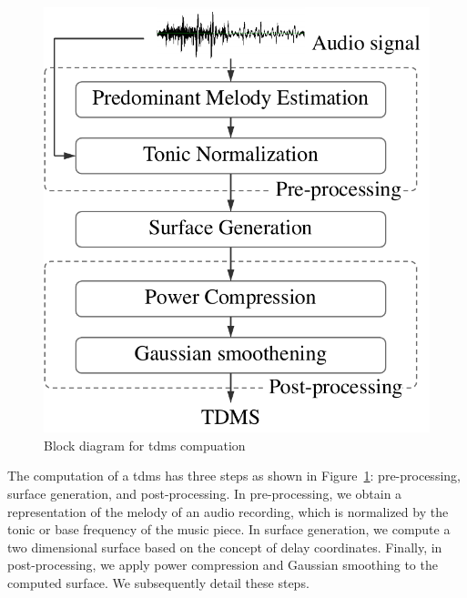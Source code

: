 \subsection{}
\label{sec:tdms_feature_extraction}

\begin{figure}
	\begin{center}
		\includegraphics[width=\figSizeSixty]{ch07_ragaRecognition/figures/tdms_computation.pdf}
	\end{center}
	\caption{Block diagram for \gls{tdms} compuation}
	\label{fig:bd_tdms_computation}
\end{figure}

The computation of a \gls{tdms} has three steps as shown in Figure~\ref{fig:bd_tdms_computation}: pre-processing, surface generation, and post-processing. In pre-processing, we obtain a representation of the melody of an audio recording, which is normalized by the tonic or base frequency of the music piece. In surface generation, we compute a two dimensional surface based on the concept of delay coordinates. Finally, in post-processing, we apply power compression and Gaussian smoothing to the computed surface. We subsequently detail these steps.

